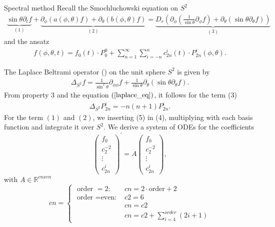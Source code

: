 \begin{frame}{Spectral method}
	\centering
	\scriptsize
	Recall the Smochluchowski equation on $S^2$
	\begin{align}
		\underbrace{\sin \theta \partial_t f}_{(1)} + \underbrace{\partial_\phi\left(a(\phi, \theta) f\right)+\partial_\theta\left(b(\phi, \theta) f\right)}_{(2)} = \underbrace{D_r \left(\partial_\phi\left(\frac{1}{\sin \theta} \partial_\phi f\right)+\partial_\theta\left(\sin \theta \partial_\theta f\right)\right)}_{(3)} \label{Smoch_S2}
	\end{align}	
	and the ansatz
	\begin{align}
		f(\phi, \theta, t) = f_0(t) \cdot P_0^0 + \sum_{n=1}^{\infty} \sum_{i=-n}^{n} c^i_{2n}(t) \cdot P^i_{2n}(\phi, \theta).
	\end{align}
\end{frame}
\begin{frame}
	\scriptsize
	
	The Laplace Beltrami operator (\cite{zbMATH07295185}) on the unit sphere $S^2$ is given by
	\begin{align}
		\Delta_{S^2} f = \frac{1}{\sin ^2 \theta} \partial_{\phi \phi} f + \frac{1}{\sin \theta} \partial_\theta\left(\sin \theta \partial_\theta f\right). \label{laplace_eq}
	\end{align}
	From property 3 and the equation $(\ref{laplace_eq})$, it follows for the term (3)
	\begin{align*}
		\Delta_{S^2} P^i_{2n} = -n(n+1)P^i_{2n}.
	\end{align*}
	For the term $(1)$ and $(2)$, we inserting (5) in (4), multiplying with each basis function and integrate it over $S^2$. We derive a system of ODEs for the coefficients
	\scriptsize
	\begin{equation}
		\left(\begin{array}{c}
			f_0 \\
			c_2^{-2} \\
			\vdots \\
			c_{2n}^i
		\end{array}\right)^{\prime}=A\left(\begin{array}{c}
			f_0 \\
			c_2^{-2} \\
			\vdots \\
			c_{2n}^i
		\end{array}\right),
	\end{equation}
with $A \in \mathbb{R}^{cnxcn}$
\begin{equation*}
	c n= \begin{cases}\text { order }=2: & cn= 2 \cdot \text {order}+2 \\ \text { order }=\text {even: } & c2=6 \\  &c n=c2 \\ &c n=c2+\sum_{i=4}^{order}(2 i+1)\end{cases}
\end{equation*}
\end{frame}

